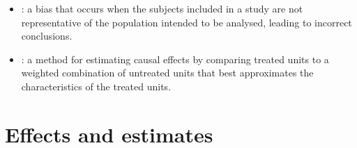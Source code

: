 \documentclass[letterpaper,10pt,english]{jupyterBook}
\begin{document}
\begin{itemize}
\item {} 
\sphinxAtStartPar
{}: a bias that occurs when the subjects included in a study are not representative of the population intended to be analysed, leading to incorrect conclusions.

\item {} 
\sphinxAtStartPar
{}: a method for estimating causal effects by comparing treated units to a weighted combination of untreated units that best approximates the characteristics of the treated units.

\end{itemize}


\section{Effects and estimates}
\end{document}
